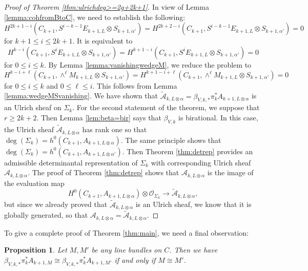 \documentclass[12pt]{amsart}
\newcounter{thmcounter}
\numberwithin{equation}{section}
\numberwithin{thmcounter}{section}
\newtheorem{proposition}[thmcounter]{Proposition}
\theoremstyle{definition}
\theoremstyle{claim}
\newcommand{\sA}{\mathscr{A}}
\newcommand{\sO}{\mathscr{O}}
\begin{document}
\begin{proof}[Proof of Theorem \ref{thm:ulrichdeg>=2g+2k+1}]
In view of Lemma \ref{lemma:cohfromBtoC}, we need to establish the following:
$$
H^{2k+1-i}(C_{k+1}, S^{i-k-1} E_{k+1,L} \otimes S_{k+1,\alpha'})=H^{2k+2-i}(C_{k+1}, S^{i-k-1}E_{k+1,L} \otimes S_{k+1,\alpha'})=0
$$
for $k+1 \leq i \leq 2k+1$. It is equivalent to
$$
H^{k-i}(C_{k+1}, S^i E_{k+1,L} \otimes S_{k+1, \alpha'}) = H^{k+1-i}(C_{k+1}, S^i E_{k+1,L} \otimes S_{k+1, \alpha'}) = 0
$$
for $0 \leq i \leq k$. By Lemma \ref{lemma:vanishingwedgeM}, we reduce the problem to
$$
H^{k-i+\ell}(C_{k+1}, \wedge^{\ell} M_{k+1,L} \otimes S_{k+1,\alpha'})=H^{k+1-i+\ell}(C_{k+1}, \wedge^{\ell} M_{k+1,L} \otimes S_{k+1,\alpha'})=0
$$
for $0 \leq i \leq k$ and $0 \leq \ell \leq i$. This follows from Lemma \ref{lemma:wedgeMSvanishing}. We have shown that $\widetilde{\mathscr{A}}_{k, L \otimes \alpha} = \beta_{V,k,*} \pi_k^* A_{k+1, L \otimes \alpha}$ is an Ulrich sheaf on $\Sigma_k$. For the second statement of the theorem, we suppose that $r \geq 2k+2$.
Then Lemma \ref{lem:beta=bir} says that $\beta_{V,k}$ is birational. In this case, the Ulrich sheaf $\widetilde{\mathscr{A}}_{k, L \otimes \alpha}$ has rank one so that $\deg(\Sigma_k)=h^0(C_{k+1},A_{k+1,L\otimes \alpha})$. The same principle shows that $\deg(\Sigma_k) = h^0(C_{k+1},A_{k+1,L\otimes \alpha'})$. Then Theorem \ref{thm:detrep} provides an admissible determinantal representation of $\Sigma_k$ with corresponding Ulrich sheaf $\sA_{k,L\otimes \alpha}$. The proof of Theorem \ref{thm:detrep} shows that $\sA_{k,L\otimes \alpha}$ is the image of the evaluation map
\[ H^0(C_{k+1},A_{k+1,L\otimes \alpha})\otimes \sO_{\Sigma_k} \longrightarrow \widetilde{\sA}_{k,L\otimes \alpha}, \]
but since we already proved that $\widetilde{\sA}_{k,L\otimes \alpha}$ is an Ulrich sheaf, we know that it is globally generated, so that $\sA_{k,L\otimes \alpha} = \widetilde{\sA}_{k,L\otimes\alpha}$.
\end{proof}

To give a complete proof of Theorem \ref{thm:main}, we need a final observation:

\begin{proposition}\label{prop:isoUlrich}
	Let $M,  M'$ be any line bundles on $C$. Then we have $\beta_{V,k,*} \pi_k^* A_{k+1, M} \cong \beta_{V,k,*} \pi_k^* A_{k+1, M'}$ if and only if $M \cong M'$.
\end{proposition}
\end{document}
